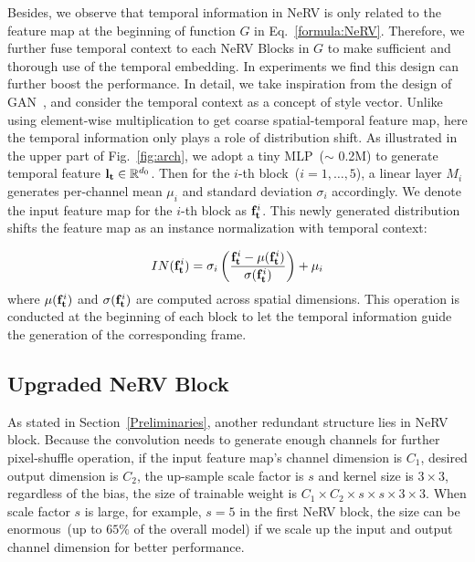 \documentclass[runningheads]{llncs}
\begin{document}
Besides, we observe that temporal information in NeRV is only related to the feature map at the beginning of function $G$ in Eq.~\ref{formula:NeRV}. Therefore, we further fuse temporal context to each NeRV Blocks in $G$ to make sufficient and thorough use of the temporal embedding. In experiments we find this design can further boost the performance. In detail, we take inspiration from the design of GAN~\cite{huang2017arbitrary}, and consider the temporal context as a concept of style vector. Unlike using element-wise multiplication to get coarse spatial-temporal feature map, here the temporal information only plays a role of distribution shift. As illustrated in the upper part of Fig.~\ref{fig:arch}, we adopt a tiny MLP~($\sim$ 0.2M) to generate temporal feature $\mathbf{l}_{\mathbf{t}}\in\mathbb{R}^{d_0}$. Then for the $i$-th block~($i=1,\dots, 5$), a linear layer $M_i$ generates per-channel mean $\mu_i$ and standard deviation $\sigma_i$ accordingly. We denote the input feature map for the $i$-th block as $\mathbf{f}_{\mathbf{t}}^i$. This newly generated distribution shifts the feature map as an instance normalization with temporal context:

\begin{equation}
    IN(\mathbf{f}_{\mathbf{t}}^i) = \sigma_i\left(\frac{\mathbf{f}_{\mathbf{t}}^i - \mu(\mathbf{f}_{\mathbf{t}}^i)}{\sigma(\mathbf{f}_{\mathbf{t}}^i)}\right) + \mu_i
\end{equation}
where $\mu(\mathbf{f}_{\mathbf{t}}^i)$ and $\sigma(\mathbf{f}_{\mathbf{t}}^i)$ are computed across spatial dimensions. This operation is conducted at the beginning of each block to let the temporal information guide the generation of the corresponding frame.


\subsection{Upgraded NeRV Block}
\label{bottleneck}

As stated in Section~\ref{Preliminaries}, another redundant structure lies in NeRV block. Because the convolution needs to generate enough channels for further pixel-shuffle operation, if the input feature map's channel dimension is $C_1$, desired output dimension is $C_2$, the up-sample scale factor is $s$ and kernel size is $3\times 3$, regardless of the bias, the size of trainable weight is $C_1\times C_2\times s\times s\times 3\times 3$. When scale factor $s$ is large, for example, $s=5$ in the first NeRV block, the size can be enormous~(up to $65\%$ of the overall model) if we scale up the input and output channel dimension for better performance.
\end{document}
